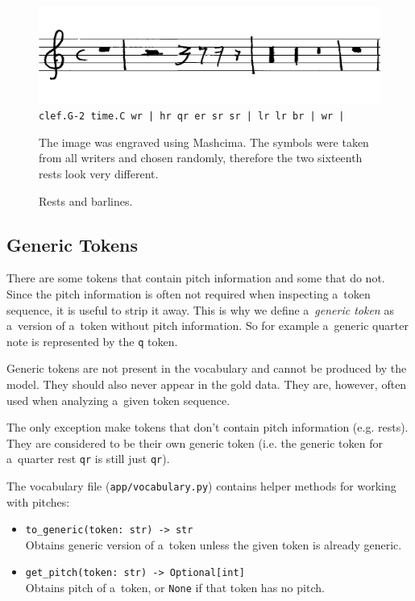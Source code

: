 \begin{figure}[h]
    \centering
    \includegraphics[width=140mm]{../img/rests-and-barlines}
    \verb`clef.G-2 time.C wr | hr qr er sr sr | lr lr br | wr |`
    \caption{Rests and barlines.}
    \label{fig4:RestsAndBarlines}
    \medskip
    \small
    The image was engraved using Mashcima. The symbols were taken from all writers and chosen randomly, therefore the two sixteenth rests look very different.
\end{figure}


\subsection{Generic Tokens}

There are some tokens that contain pitch information and some that do not. Since the pitch information is often not required when inspecting a~token sequence, it is useful to strip it away. This is why we define a~\emph{generic token} as a~version of a~token without pitch information. So for example a~generic quarter note is represented by the \texttt{q} token.

Generic tokens are not present in the vocabulary and cannot be produced by the model. They should also never appear in the gold data. They are, however, often used when analyzing a~given token sequence.

The only exception make tokens that don't contain pitch information (e.g. rests). They are considered to be their own generic token (i.e. the generic token for a~quarter rest \texttt{qr} is still just \texttt{qr}).

The vocabulary file (\texttt{app/vocabulary.py}) contains helper methods for working with pitches:

\begin{itemize}
\item \verb"to_generic(token: str) -> str"\\
Obtains generic version of a~token unless the given token is already generic.
\item \verb"get_pitch(token: str) -> Optional[int]"\\
Obtains pitch of a~token, or \texttt{None} if that token has no pitch.
\end{itemize}


